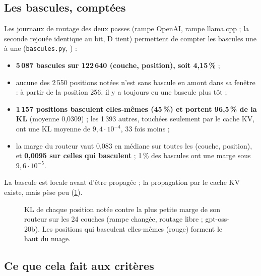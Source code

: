 \subsection{Les bascules, comptées}\label{sec:t2r-comptees}

Les journaux de routage des deux passes (rampe OpenAI, rampe llama.cpp ; la seconde rejouée identique au bit, D tient) permettent de compter les bascules une à une (\texttt{bascules.py}, ) \mes :
\begin{itemize}
\item \textbf{5\,087 bascules sur 122\,640 (couche, position), soit 4,15\,\%} ;
\item aucune des 2\,550 positions notées n'est sans bascule en amont dans sa fenêtre : à partir de la position 256, il y a toujours eu une bascule plus tôt ;
\item \textbf{1\,157 positions basculent elles-mêmes (45\,\%) et portent 96,5\,\% de la KL} (moyenne 0,0309) ; les 1\,393 autres, touchées seulement par le cache KV, ont une KL moyenne de $9{,}4\cdot10^{-4}$, 33 fois moins ;
\item la marge du routeur vaut 0,083 en médiane sur toutes les (couche, position), et \textbf{0,0095 sur celles qui basculent} ; 1\,\% des bascules ont une marge sous $9{,}6\cdot10^{-5}$.
\end{itemize}
La bascule est locale avant d'être propagée ; la propagation par le cache KV existe, mais pèse peu (\cref{fig:t2r-bascules}).

\begin{figure}[ht]
\centering
\GrapheRefBascules
\caption[KL par position contre la marge du routeur]{KL de chaque position notée contre la plus petite marge de son routeur sur les 24 couches (rampe changée, routage libre ; gpt-oss-20b). Les positions qui basculent elles-mêmes (rouge) forment le haut du nuage.}
\label{fig:t2r-bascules}
\end{figure}

\subsection{Ce que cela fait aux critères}\label{sec:t2r-criteres}


